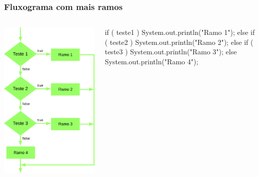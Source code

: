 \documentclass[xcolor={dvipsnames,table},aspectratio=169]{beamer}
\begin{document}
\begin{frame}[fragile]\frametitle{Fluxograma com mais ramos}
\begin{columns}
\begin{column}{0.4\textwidth}
	\begin{center}
	\includegraphics[height=0.7\paperheight]{pucrs-ep-fprog-unidade_03-decisoes-laminas-if_com_varios_ramos.png}
	\end{center}
\end{column}
\begin{column}{0.6\textwidth}
\scriptsize{
\begin{javacode}
if ( teste1 ) {
   System.out.println("Ramo 1");
}
else {
   if ( teste2 ) {
      System.out.println("Ramo 2");
   }
   else {
      if ( teste3 ) {
         System.out.println("Ramo 3");
      }
      else {
         System.out.println("Ramo 4");
      }	
   }
}
\end{javacode}
}
\end{column}
\end{columns}
\end{frame}
\end{document}
